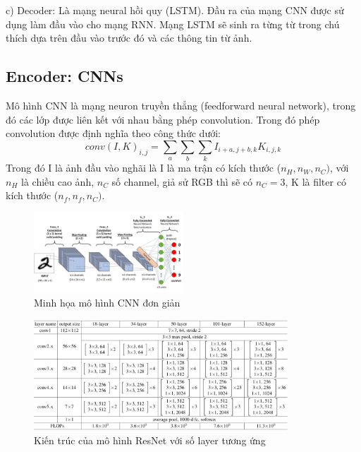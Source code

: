 \documentclass[conference]{IEEEtran}
\begin{document}
c) Decoder: Là mạng neural hồi quy (LSTM). Đầu ra của mạng CNN được sử dụng làm đầu vào cho mạng RNN. Mạng LSTM sẽ sinh ra từng từ trong chú thích dựa trên đầu vào trước đó và các thông tin từ ảnh. 


\subsection{Encoder: CNNs}
Mô hình CNN là mạng neuron truyền thẳng (feedforward neural network), trong đó các lớp được liên kết với nhau bằng phép convolution. Trong đó phép convolution được định nghĩa theo công thức dưới:
$$conv(I,K)_{i,j}=\sum_{a}\sum_{b}\sum_{k}I_{i+a,j+b,k}K_{i,j,k}$$
Trong đó I là ảnh đầu vào nghãi là I là ma trận có kích thước ($n_{H},n_{W},n_{C})$, với $n_{H}$ là chiều cao ảnh, $n_{C}$ số channel, giả sử RGB thì sẽ có $n_{C}=3$, K là filter có kích thước ($n_{f},n_{f},n_{C})$.

\begin{figure}[h]
\includegraphics[width=0.5\textwidth]{assets/simpleCNN.jpeg}
  \caption{Minh họa mô hình CNN đơn giản}
  \label{fig:CNN_architecture}
\end{figure}

\begin{figure}[t]
\centering
\includegraphics[width=0.85\textwidth]{assets/resnet.png}
  \caption{Kiến trúc của mô hình ResNet với số layer tương ứng }
  \label{fig:resnet_architecture}
\end{figure}
\end{document}
